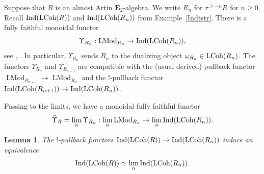 \documentclass[leqno,12pt]{amsart}
\theoremstyle{plain}
\newtheorem{Lemma}[Theorem]{Lemma}
\theoremstyle{definition}
\newcommand{\Ind}{\operatorname{Ind}}
\newcommand{\etwo}{\mathbf{E}_2}
\newcommand{\LMod}{\operatorname{LMod}}
\begin{document}
Suppose that $R$ is an almost Artin $\etwo$-algebra.
We write $R_n$ for $\tau^{\ge -n}R$ for $n\ge0$.
Recall $\Ind(\textup{LCoh}(R))$ and $\Ind(\textup{LCoh}(R_n))$ from Example~\ref{Indtstr}.
There is a fully faithful monoidal functor
\[
\Upsilon_{R_n}:\LMod_{R_n}\to \Ind(\textup{LCoh}(R_n)),
\]
see \cite[Corollary 9.6.3]{Ind}, \cite{CKDA}.
In particular, $\Upsilon_{R_n}$ sends $R_n$ to the dualizing object $\omega_{R_n}\in \textup{LCoh}(R_n)$.
The functors $\Upsilon_{R_n}$ and $\Upsilon_{R_{n+1}}$ are compatible with the (usual derived) pullback functor $\LMod_{R_{n+1}}\to \LMod_{R_n}$
and the $!$-pullback functor $\Ind(\textup{LCoh}(R_{n+1}))\to \Ind(\textup{LCoh}(R_n))$.



Passing to the limits,
we have a monoidal fully faithful functor
\[
\widehat{\Upsilon}_R=\lim_{n} \Upsilon_{R_n}: \lim_{n}\LMod_{R_n}\to \lim_{n}\Ind(\textup{LCoh}(R_n)).
\]

\begin{Lemma}
\label{contiind}
The $!$-pullback functors $\Ind(\textup{LCoh}(R))\to \Ind(\textup{LCoh}(R_n))$ induce an equivalence
\[
\Ind(\textup{LCoh}(R))\simeq \lim_{n}\Ind(\textup{LCoh}(R_n)).
\]
\end{Lemma}
\end{document}

